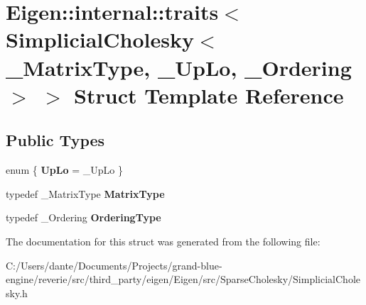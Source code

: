 \hypertarget{struct_eigen_1_1internal_1_1traits_3_01_simplicial_cholesky_3_01___matrix_type_00_01___up_lo_00_01___ordering_01_4_01_4}{}\section{Eigen\+::internal\+::traits$<$ Simplicial\+Cholesky$<$ \+\_\+\+Matrix\+Type, \+\_\+\+Up\+Lo, \+\_\+\+Ordering $>$ $>$ Struct Template Reference}
\label{struct_eigen_1_1internal_1_1traits_3_01_simplicial_cholesky_3_01___matrix_type_00_01___up_lo_00_01___ordering_01_4_01_4}
\subsection*{Public Types}
\begin{DoxyCompactItemize}
\item 
\mbox{\label{struct_eigen_1_1internal_1_1traits_3_01_simplicial_cholesky_3_01___matrix_type_00_01___up_lo_00_01___ordering_01_4_01_4_ab81a8c397671eaa06b56e04b80b0a278}} 
enum \{ {\bfseries Up\+Lo} = \+\_\+\+Up\+Lo
 \}
\item 
\mbox{\label{struct_eigen_1_1internal_1_1traits_3_01_simplicial_cholesky_3_01___matrix_type_00_01___up_lo_00_01___ordering_01_4_01_4_a1c214738e9757344ce70a32118b08628}} 
typedef \+\_\+\+Matrix\+Type {\bfseries Matrix\+Type}
\item 
\mbox{\label{struct_eigen_1_1internal_1_1traits_3_01_simplicial_cholesky_3_01___matrix_type_00_01___up_lo_00_01___ordering_01_4_01_4_a36a8c1dd5aa30d04be1839a9741ebf9c}} 
typedef \+\_\+\+Ordering {\bfseries Ordering\+Type}
\end{DoxyCompactItemize}


The documentation for this struct was generated from the following file\+:\begin{DoxyCompactItemize}
\item 
C\+:/\+Users/dante/\+Documents/\+Projects/grand-\/blue-\/engine/reverie/src/third\+\_\+party/eigen/\+Eigen/src/\+Sparse\+Cholesky/Simplicial\+Cholesky.\+h\end{DoxyCompactItemize}
